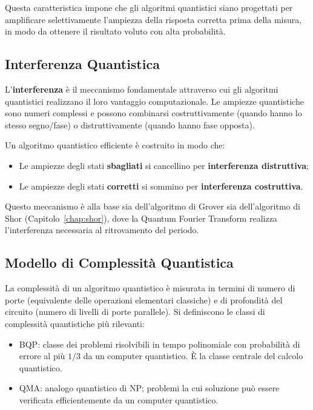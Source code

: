 \begin{onehalfspace}
Questa caratteristica impone che gli algoritmi quantistici siano progettati per amplificare selettivamente l'ampiezza della risposta corretta prima della misura, in modo da ottenere il risultato voluto con alta probabilità.

\subsection{Interferenza Quantistica}

L'\textbf{interferenza} è il meccanismo fondamentale attraverso cui gli algoritmi quantistici realizzano il loro vantaggio computazionale. Le ampiezze quantistiche sono numeri complessi e possono combinarsi costruttivamente (quando hanno lo stesso segno/fase) o distruttivamente (quando hanno fase opposta).

Un algoritmo quantistico efficiente è costruito in modo che:
\begin{itemize}
    \item Le ampiezze degli stati \textbf{sbagliati} si cancellino per \textbf{interferenza distruttiva};
    \item Le ampiezze degli stati \textbf{corretti} si sommino per \textbf{interferenza costruttiva}.
\end{itemize}

Questo meccanismo è alla base sia dell'algoritmo di Grover sia dell'algoritmo di Shor (Capitolo~\ref{chap:shor}), dove la Quantum Fourier Transform realizza l'interferenza necessaria al ritrovamento del periodo.

\subsection{Modello di Complessità Quantistica}

La complessità di un algoritmo quantistico è misurata in termini di numero di porte (equivalente delle operazioni elementari classiche) e di profondità del circuito (numero di livelli di porte parallele). Si definiscono le classi di complessità quantistiche più rilevanti:

\begin{itemize}
    \item \ac{BQP}: classe dei problemi risolvibili in tempo polinomiale con probabilità di errore al più $1/3$ da un computer quantistico. È la classe centrale del calcolo quantistico.

    \item \ac{QMA}: analogo quantistico di NP; problemi la cui soluzione può essere verificata efficientemente da un computer quantistico.
\end{itemize}


\end{onehalfspace}

